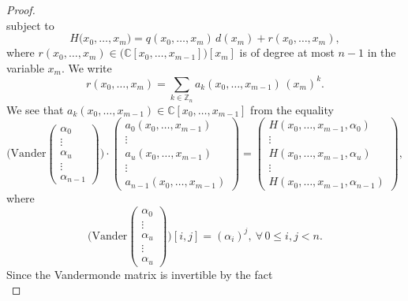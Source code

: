 \begin{proof}
\[\]
subject to
\begin{equation}
H\big(x_{0},\ldots,x_{m}\big)=q(x_{0},\ldots,x_{m})\,d(x_{m})+r(x_{0},\ldots,x_{m}),
\end{equation}
where $r\left(x_{0},\ldots,x_{m}\right)\in\big(\mathbb{C}[x_{0},\ldots,x_{m-1}]\big)[x_{m}]$
is of degree at most $n-1$ in the variable $x_{m}$. We write 
\begin{equation}
r\left(x_{0},\ldots,x_{m}\right)=\sum_{k\in\mathbb{Z}_{n}}a_{k}\left(x_{0},\ldots,x_{m-1}\right)\,(x_{m})^{k}.
\end{equation}
We see that $a_{k}(x_{0},\ldots,x_{m-1})\in\mathbb{C}[x_{0},\ldots,x_{m-1}]$
from the equality 
\begin{equation}
\bigg(\text{Vander}\left(\begin{array}{c}
\alpha_{0}\\
\vdots\\
\alpha_{u}\\
\vdots\\
\alpha_{n-1}
\end{array}\right)\bigg)\cdot\left(\begin{array}{c}
a_{0}\left(x_{0},\ldots,x_{m-1}\right)\\
\vdots\\
a_{u}\left(x_{0},\ldots,x_{m-1}\right)\\
\vdots\\
a_{n-1}\left(x_{0},\ldots,x_{m-1}\right)
\end{array}\right)=\left(\begin{array}{c}
H(x_{0},\ldots,x_{m-1},\alpha_{0})\\
\vdots\\
H(x_{0},\ldots,x_{m-1},\alpha_{u})\\
\vdots\\
H(x_{0},\ldots,x_{m-1},\alpha_{n-1})
\end{array}\right),
\end{equation}
where 
\begin{equation}
\bigg(\text{Vander}\left(\begin{array}{c}
\alpha_{0}\\
\vdots\\
\alpha_{u}\\
\vdots\\
\alpha_{u}
\end{array}\right)\bigg)\left[i,j\right]=(\alpha_{i})^{j},\ \forall\,0\le i,j<n.
\end{equation}
Since the Vandermonde matrix is invertible by the fact
\begin{equation}

\end{equation}
\end{proof}
